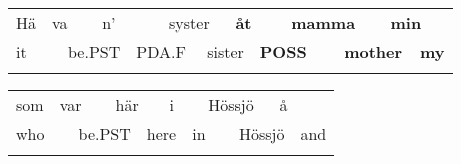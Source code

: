 \begin{listWWNumlxxxvleveli}
\item {}

\end{listWWNumlxxxvleveli}

\begin{tabular}{llllllllllllll}
\lsptoprule
Hä & \multicolumn{2}{l}{va

} & \multicolumn{2}{l}{n’

} & \multicolumn{2}{l}{syster

} & \multicolumn{2}{l}{{\bfseries åt}

} & \multicolumn{2}{l}{{\bfseries mamma}

} & \multicolumn{2}{l}{{\bfseries min}

} & \\
\multicolumn{2}{l}{it

} & \multicolumn{2}{l}{be.PST

} & \multicolumn{2}{l}{PDA.F

} & \multicolumn{2}{l}{sister

} & \multicolumn{2}{l}{{\bfseries POSS}

} & \multicolumn{2}{l}{{\bfseries mother}

} & \multicolumn{2}{l}{{\bfseries my}

}\\
\lspbottomrule
\end{tabular}

\begin{tabular}{llllllllllll}
\lsptoprule
som & \multicolumn{2}{l}{var

} & \multicolumn{2}{l}{här

} & \multicolumn{2}{l}{i

} & \multicolumn{2}{l}{Hössjö

} & \multicolumn{2}{l}{å

} & \\
\multicolumn{2}{l}{who

} & \multicolumn{2}{l}{be.PST

} & \multicolumn{2}{l}{here

} & \multicolumn{2}{l}{in

} & \multicolumn{2}{l}{Hössjö

} & \multicolumn{2}{l}{and

}\\
\lspbottomrule
\end{tabular}

